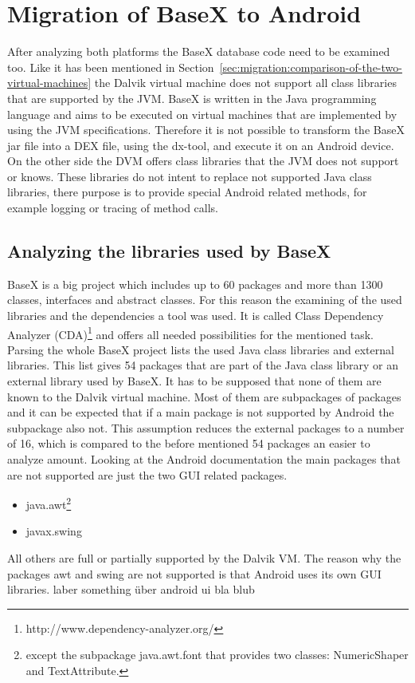\section{Migration of BaseX to Android}
\label{sec:migration:migration-of-basex-to-android}
After analyzing both platforms the BaseX database code need to be examined too.
Like it has been mentioned in Section~\ref{sec:migration:comparison-of-the-two-virtual-machines} the Dalvik virtual machine does not support all class libraries that are supported by the JVM.
BaseX is written in the Java programming language and aims to be executed on virtual machines that are implemented by using the JVM specifications.
Therefore it is not possible to transform the BaseX jar file into a DEX file, using the dx-tool, and execute it on an Android device.
On the other side the DVM offers class libraries that the JVM does not support or knows.
These libraries do not intent to replace not supported Java class libraries, there purpose is to provide special Android related methods, for example logging or tracing of method calls.

\subsection{Analyzing the libraries used by BaseX}
\label{sec:migration:analyzing-the-libraries-used-by-basex}
BaseX is a big project which includes up to 60 packages and more than 1300 classes, interfaces and abstract classes.
For this reason the examining of the used libraries and the dependencies a tool was used.
It is called Class Dependency Analyzer (CDA)\footnote{http://www.dependency-analyzer.org/} and offers all needed possibilities for the mentioned task.
Parsing the whole BaseX project lists the used Java class libraries and external libraries.
This list gives 54 packages that are part of the Java class library or an external library used by BaseX.
It has to be supposed that none of them are known to the Dalvik virtual machine.
Most of them are subpackages of packages and it can be expected that if a main package is not supported by Android the subpackage also not. 
This assumption reduces the external packages to a number of 16, which is compared to the before mentioned 54 packages an easier to analyze amount.
Looking at the Android documentation the main packages that are not supported are just the two GUI related packages.
\begin{itemize}
  \item java.awt\footnote{except the subpackage java.awt.font that provides two classes: NumericShaper and TextAttribute.}
  \item javax.swing
\end{itemize}
All others are full or partially supported by the Dalvik VM.
The reason why the packages awt and swing are not supported is that Android uses its own GUI libraries.
laber something über android ui bla blub

